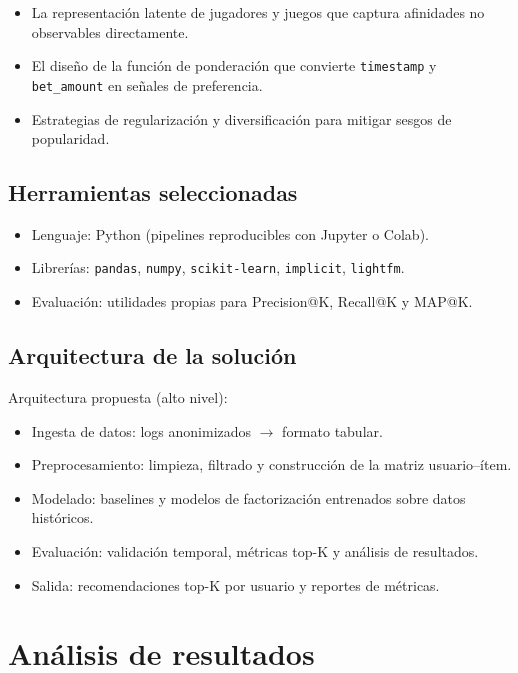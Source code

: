 \documentclass[12pt,a4paper]{article}
\begin{document}
\begin{itemize}
    \item La representación latente de jugadores y juegos que captura afinidades no observables directamente.
    \item El diseño de la función de ponderación que convierte \texttt{timestamp} y \texttt{bet\_amount} en señales de preferencia.
    \item Estrategias de regularización y diversificación para mitigar sesgos de popularidad.
\end{itemize}

\subsection{Herramientas seleccionadas}

\begin{itemize}
    \item Lenguaje: Python (pipelines reproducibles con Jupyter o Colab).
    \item Librerías: \texttt{pandas}, \texttt{numpy}, \texttt{scikit-learn}, \texttt{implicit}, \texttt{lightfm}.
    \item Evaluación: utilidades propias para Precision@K, Recall@K y MAP@K.
\end{itemize}

\subsection{Arquitectura de la solución}

Arquitectura propuesta (alto nivel):

\begin{itemize}
    \item Ingesta de datos: logs anonimizados $\rightarrow$ formato tabular.
    \item Preprocesamiento: limpieza, filtrado y construcción de la matriz usuario--ítem.
    \item Modelado: baselines y modelos de factorización entrenados sobre datos históricos.
    \item Evaluación: validación temporal, métricas top-K y análisis de resultados.
    \item Salida: recomendaciones top-K por usuario y reportes de métricas.
\end{itemize}

\section{Análisis de resultados}
\end{document}

